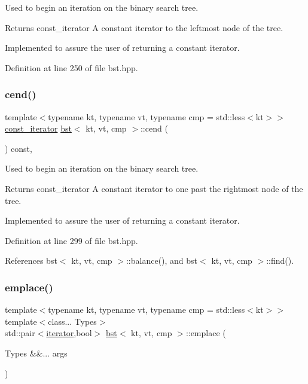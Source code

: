 Used to begin an iteration on the binary search tree. 

\begin{DoxyReturn}{Returns}
const\+\_\+iterator A constant iterator to the leftmost node of the tree.
\end{DoxyReturn}
Implemented to assure the user of returning a constant iterator. 

Definition at line 250 of file bst.\+hpp.

\mbox{\label{classbst_a2f78931b69f0a121823b60393f1b9745}} 
\subsubsection{\texorpdfstring{cend()}{cend()}}
{\footnotesize\ttfamily template$<$typename kt, typename vt, typename cmp = std\+::less$<$kt$>$$>$ \\
\hyperlink{classbst_a72485696d999bf489c6156f6327a2163}{const\+\_\+iterator} \hyperlink{classbst}{bst}$<$ kt, vt, cmp $>$\+::cend (\begin{DoxyParamCaption}{ }\end{DoxyParamCaption}) const\hspace{0.3cm}{\ttfamily [inline]}, {\ttfamily [noexcept]}}



Used to begin an iteration on the binary search tree. 

\begin{DoxyReturn}{Returns}
const\+\_\+iterator A constant iterator to one past the rightmost node of the tree.
\end{DoxyReturn}
Implemented to assure the user of returning a constant iterator. 

Definition at line 299 of file bst.\+hpp.



References bst$<$ kt, vt, cmp $>$\+::balance(), and bst$<$ kt, vt, cmp $>$\+::find().

\mbox{\label{classbst_a03e09650b371d423315f26520d6e34a6}} 
\subsubsection{\texorpdfstring{emplace()}{emplace()}}
{\footnotesize\ttfamily template$<$typename kt, typename vt, typename cmp = std\+::less$<$kt$>$$>$ \\
template$<$class... Types$>$ \\
std\+::pair$<$\hyperlink{classbst_a429b0445783ff6486882db5dee900ce0}{iterator},bool$>$ \hyperlink{classbst}{bst}$<$ kt, vt, cmp $>$\+::emplace (\begin{DoxyParamCaption}\item[{Types \&\&...}]{args }\end{DoxyParamCaption})}




